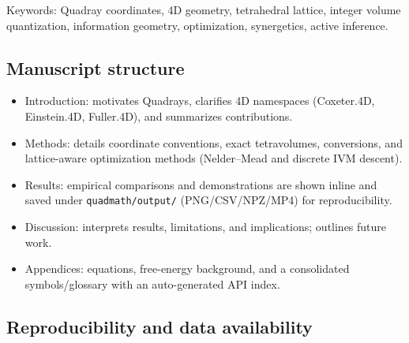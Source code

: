 \documentclass[
  10pt,
]{article}
\newcommand{\passthrough}[1]{#1}
\providecommand{\tightlist}{%
  \setlength{\itemsep}{0pt}\setlength{\parskip}{0pt}}
\begin{document}
Keywords: Quadray coordinates, 4D geometry, tetrahedral lattice, integer
volume quantization, information geometry, optimization, synergetics,
active inference.

\hypertarget{manuscript-structure}{%
\subsection{Manuscript structure}\label{manuscript-structure}}

\begin{itemize}
\tightlist
\item
  Introduction: motivates Quadrays, clarifies 4D namespaces (Coxeter.4D,
  Einstein.4D, Fuller.4D), and summarizes contributions.
\item
  Methods: details coordinate conventions, exact tetravolumes,
  conversions, and lattice-aware optimization methods (Nelder--Mead and
  discrete IVM descent).
\item
  Results: empirical comparisons and demonstrations are shown inline and
  saved under \passthrough{\lstinline!quadmath/output/!}
  (PNG/CSV/NPZ/MP4) for reproducibility.
\item
  Discussion: interprets results, limitations, and implications;
  outlines future work.
\item
  Appendices: equations, free-energy background, and a consolidated
  symbols/glossary with an auto-generated API index.
\end{itemize}

\hypertarget{reproducibility-and-data-availability}{%
\subsection{Reproducibility and data
availability}\label{reproducibility-and-data-availability}}
\end{document}
